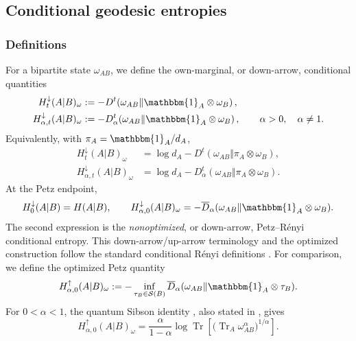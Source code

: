 \documentclass[11pt]{article}
\theoremstyle{remark}
\newcommand{\1}{\mathbbm{1}}
\begin{document}
\subsection{Conditional geodesic entropies}
\label{subsec:conditional-geodesic-entropies}

\subsubsection{Definitions}

For a bipartite state $\omega_{AB}$, we define the own-marginal, or
down-arrow, conditional quantities
\begin{align}
 H_t^\downarrow(A|B)_\omega
 &:=-D^t\!\left(\omega_{AB}\middle\Vert
                 \1_A\otimes\omega_B\right),
 \label{eq:def-Ht-down-continuity}\\
 H_{\alpha,t}^\downarrow(A|B)_\omega
 &:=-D_\alpha^t\!\left(\omega_{AB}\middle\Vert
                 \1_A\otimes\omega_B\right),
 \qquad \alpha>0,\quad\alpha\neq1.
 \label{eq:def-Halpha-t-down-continuity}
\end{align}
Equivalently, with $\pi_A=\1_A/d_A$,
\begin{align}
 H_t^\downarrow(A|B)_\omega
 &=\log d_A-D^t(\omega_{AB}\Vert\pi_A\otimes\omega_B),
 \label{eq:Ht-down-normalized-reference}\\
 H_{\alpha,t}^\downarrow(A|B)_\omega
 &=\log d_A-D_\alpha^t(\omega_{AB}\Vert
                               \pi_A\otimes\omega_B).
 \label{eq:Halpha-t-down-normalized-reference}
\end{align}
At the Petz endpoint,
\begin{equation}
 H_0^\downarrow(A|B)=H(A|B),
 \qquad
 H_{\alpha,0}^\downarrow(A|B)_\omega
 =-\overline D_\alpha
   (\omega_{AB}\Vert\1_A\otimes\omega_B).
 \label{eq:conditional-Petz-endpoints}
\end{equation}
The second expression is the \emph{nonoptimized}, or down-arrow,
Petz--R\'enyi conditional entropy.  This down-arrow/up-arrow
terminology and the optimized construction follow the standard
conditional R\'enyi definitions
\cite[Section~II, Eqs.~(13)--(16)]{tomamichel2014relating}.
For comparison, we define the
optimized Petz quantity
\begin{equation}
 H_{\alpha,0}^\uparrow(A|B)_\omega
 :=-\inf_{\tau_B\in\mathcal S(B)}
 \overline D_\alpha
     (\omega_{AB}\Vert\1_A\otimes\tau_B).
 \label{eq:def-Halpha-zero-up}
\end{equation}
For $0<\alpha<1$, the quantum Sibson identity
\cite[Lemma~3 in the Supplemental Material]{sharma2013fundamental},
also stated in \cite[Lemma~1]{tomamichel2014relating}, gives
\begin{equation}
 H_{\alpha,0}^\uparrow(A|B)_\omega
 =\frac{\alpha}{1-\alpha}
 \log\operatorname{Tr}\!\left[
 \bigl(\operatorname{Tr}_A\omega_{AB}^{\alpha}\bigr)^{1/\alpha}
 \right].
 \label{eq:Sibson-optimized-Petz}
\end{equation}
\end{document}
